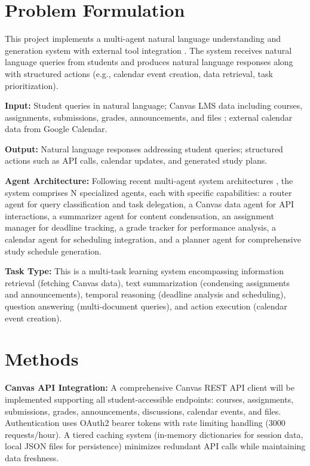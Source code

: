 \documentclass{article}
\begin{document}
\section{Problem Formulation}
This project implements a multi-agent natural language understanding and generation system with external tool integration \cite{chen2024llmma}. The system receives natural language queries from students and produces natural language responses along with structured actions (e.g., calendar event creation, data retrieval, task prioritization).

\textbf{Input:} Student queries in natural language; Canvas LMS data including courses, assignments, submissions, grades, announcements, and files \cite{lms2025ai}; external calendar data from Google Calendar.

\textbf{Output:} Natural language responses addressing student queries; structured actions such as API calls, calendar updates, and generated study plans.

\textbf{Agent Architecture:} Following recent multi-agent system architectures \cite{wang2025megaagent, anthropic2025multiagent}, the system comprises N specialized agents, each with specific capabilities: a router agent for query classification and task delegation, a Canvas data agent for API interactions, a summarizer agent for content condensation, an assignment manager for deadline tracking, a grade tracker for performance analysis, a calendar agent for scheduling integration, and a planner agent for comprehensive study schedule generation.

\textbf{Task Type:} This is a multi-task learning system \cite{llmmas2025software} encompassing information retrieval (fetching Canvas data), text summarization (condensing assignments and announcements), temporal reasoning (deadline analysis and scheduling), question answering (multi-document queries), and action execution (calendar event creation).

\section{Methods}
\textbf{Canvas API Integration:} A comprehensive Canvas REST API client will be implemented supporting all student-accessible endpoints: courses, assignments, submissions, grades, announcements, discussions, calendar events, and files. Authentication uses OAuth2 bearer tokens with rate limiting handling (3000 requests/hour). A tiered caching system (in-memory dictionaries for session data, local JSON files for persistence) minimizes redundant API calls while maintaining data freshness.
\end{document}

